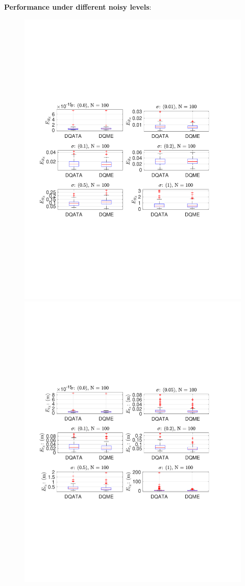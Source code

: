 \documentclass[a4paper]{report}
\begin{document}
\textbf{Performance under different noisy levels}:
\begin{figure}
\centering
\includegraphics[scale=0.6]{./hand_eye_figures/dq/dq_er_cmp_noise}
\includegraphics[scale=0.6]{./hand_eye_figures/dq/dq_et_cmp_noise}

\end{figure}
\end{document}

